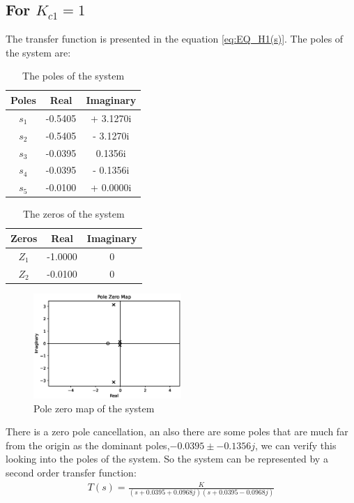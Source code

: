 \documentclass[a4paper]{article}
\begin{document}
\subsection*{For $K_{c1}=1$}
The transfer function is presented in the equation \ref{eq:EQ_H1(s)}. The poles of the system are:
\begin{multicols}{2}
\begin{table}[H]
\centering
\begin{tabular}{|c|c|c|}
\hline
Poles & Real & Imaginary \\
\hline
$s_1$ & -0.5405 & + 3.1270i\\
\hline
$s_2$&  -0.5405 & - 3.1270i\\
\hline
$s_3$&  -0.0395 & 0.1356i\\
\hline
$s_4$&  -0.0395 & - 0.1356i\\
\hline
$s_5$&  -0.0100 & + 0.0000i\\
\hline
\end{tabular}
\caption{The poles of the system}
\end{table}
\columnbreak
\begin{table}[H]
\centering
\begin{tabular}{|c|c|c|}
\hline
Zeros & Real & Imaginary\\
\hline
$Z_1$ &  -1.0000 & 0 \\
\hline
$Z_2$ & -0.0100 & 0\\
\hline
\end{tabular}
\caption{The zeros of the system}
\end{table}
\end{multicols}
\begin{figure}[H]
\centering
\includegraphics[width=0.5\textwidth]{Figures/Question6/EXE_6_pzmap.eps}
\caption{Pole zero map of the system}
\end{figure}

There is a zero pole cancellation, an also there are some poles that are much far from the origin as the dominant poles,$-0.0395 \pm - 0.1356j$, we can verify this looking into the poles of the system. So the system can be represented by a second order transfer function:
\begin{align*}
T(s) = \frac{K}{(s+0.0395+0.0968j)(s+0.0395-0.0968j)}
\end{align*}
\end{document}
